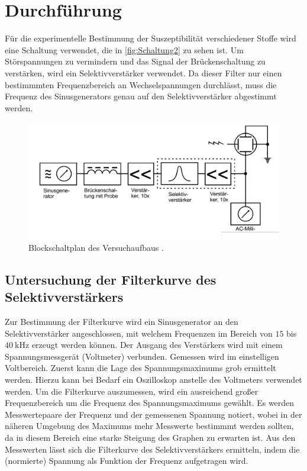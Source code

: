 \section{Durchführung}
\label{sec:Durchführung}
Für die experimentelle Bestimmung der Suszeptibilität verschiedener Stoffe wird eine Schaltung verwendet, die in \autoref{fig:Schaltung2} zu sehen ist.
Um Störspannungen zu vermindern und das Signal der Brückenschaltung zu verstärken, wird ein Selektivverstärker verwendet. Da dieser Filter nur einen 
bestimmmten Frequenzbereich an Wechselspannungen durchlässt, muss die Frequenz des Sinusgenerators genau auf den Selektivverstärker abgestimmt werden.

\begin{figure}
    \centering
    \includegraphics[width = .8\textwidth]{content/Schaltung2.png}
    \caption{Blockschaltplan des Versuchaufbaus \cite{v606}.}
    \label{fig:Schaltung2}
\end{figure}

\subsection{Untersuchung der Filterkurve des Selektivverstärkers}
\label{subsec:D_Filterkurve}
Zur Bestimmung der Filterkurve wird ein Sinusgenerator an den Selektivverstärker angeschlossen, mit welchem Frequenzen im Bereich von $15$ bis $\qty{40}{\kilo\hertz}$
erzeugt werden können. Der Ausgang des Verstärkers wird mit einem Spannungsmessgerät (Voltmeter) verbunden. Gemessen wird im einstelligen Voltbereich.
Zuerst kann die Lage des Spannungsmaximums grob ermittelt werden. Hierzu kann bei Bedarf ein Oszilloskop anstelle des Voltmeters verwendet werden.
Um die Filterkurve auszumessen, wird ein ausreichend großer Frequenzbereich um die Frequenz des Spannungsmaximums gewählt. Es werden Messwertepaare der Frequenz
und der gemessenen Spannung notiert, wobei in der näheren Umgebung des Maximums mehr Messwerte bestimmmt werden sollten, da in diesem Bereich eine starke Steigung 
des Graphen zu erwarten ist.
Aus den Messwerten lässt sich die Filterkurve des Selektivverstärkers ermitteln, indem die (normierte) Spannung als Funktion der Frequenz aufgetragen wird.

